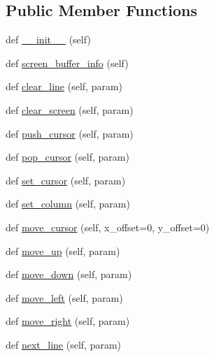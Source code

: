 \subsection*{Public Member Functions}
\begin{DoxyCompactItemize}
\item 
def \hyperlink{classwaflib_1_1ansiterm_1_1_ansi_term_ab397a7401f836bb9f96d9e54c6333821}{\+\_\+\+\_\+init\+\_\+\+\_\+} (self)
\item 
def \hyperlink{classwaflib_1_1ansiterm_1_1_ansi_term_afdb1bac8f2508bdf2279320b85286196}{screen\+\_\+buffer\+\_\+info} (self)
\item 
def \hyperlink{classwaflib_1_1ansiterm_1_1_ansi_term_ae9df276c42e0569ad63c20c19de62b93}{clear\+\_\+line} (self, param)
\item 
def \hyperlink{classwaflib_1_1ansiterm_1_1_ansi_term_aa94cc04f29c4c51e0013e5cb87c0fd07}{clear\+\_\+screen} (self, param)
\item 
def \hyperlink{classwaflib_1_1ansiterm_1_1_ansi_term_a9f489138508401c64c6927f215d8d6da}{push\+\_\+cursor} (self, param)
\item 
def \hyperlink{classwaflib_1_1ansiterm_1_1_ansi_term_a2093c2f7ded18188b0bf2989a0083a18}{pop\+\_\+cursor} (self, param)
\item 
def \hyperlink{classwaflib_1_1ansiterm_1_1_ansi_term_aba842837a7fe351aa8459aa375249c69}{set\+\_\+cursor} (self, param)
\item 
def \hyperlink{classwaflib_1_1ansiterm_1_1_ansi_term_acd65956a7d56681cc669acca5bdd43fb}{set\+\_\+column} (self, param)
\item 
def \hyperlink{classwaflib_1_1ansiterm_1_1_ansi_term_ade95c6eb1c7ed7928780aad4e6b4e268}{move\+\_\+cursor} (self, x\+\_\+offset=0, y\+\_\+offset=0)
\item 
def \hyperlink{classwaflib_1_1ansiterm_1_1_ansi_term_a7725bd9ed185458669ad7601fb7ff9d9}{move\+\_\+up} (self, param)
\item 
def \hyperlink{classwaflib_1_1ansiterm_1_1_ansi_term_a7b2ea0403457b7cd8d0ac4088064d812}{move\+\_\+down} (self, param)
\item 
def \hyperlink{classwaflib_1_1ansiterm_1_1_ansi_term_a617dda0ced0a3e3f3443366d4a1c46bb}{move\+\_\+left} (self, param)
\item 
def \hyperlink{classwaflib_1_1ansiterm_1_1_ansi_term_a1388984c5cb5051d6c48682d1cd998b7}{move\+\_\+right} (self, param)
\item 
def \hyperlink{classwaflib_1_1ansiterm_1_1_ansi_term_a8ce79cf478dc1bf0cec2c12e28103522}{next\+\_\+line} (self, param)

\end{DoxyCompactItemize}
